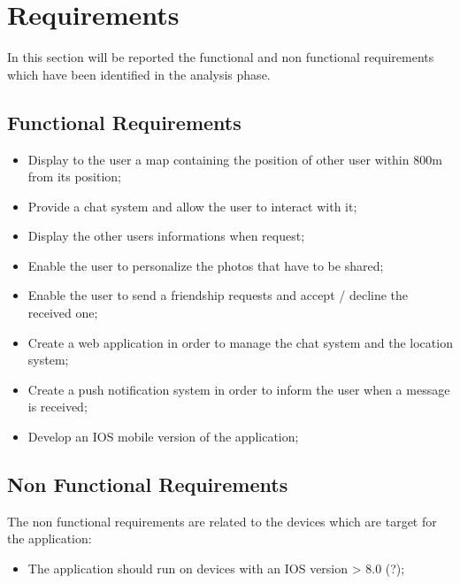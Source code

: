 \section{Requirements}
In this section will be reported the functional and non functional requirements which have been identified in the analysis phase.
\subsection{Functional Requirements}
\begin{itemize}
\item Display to the user a map containing the position of other user within 800m from its position;
\item Provide a chat system and allow the user to interact with it;
\item Display the other users informations when request;
\item Enable the user to personalize the photos that have to be shared;
\item Enable the user to send a friendship requests and accept / decline the received one;
\item Create a web application in order to manage the chat system and the location system;
\item Create a push notification system in order to inform the user when a message is received;
\item Develop an IOS mobile version of the application;
\end{itemize} 


\subsection{Non Functional Requirements}
The non functional requirements are related to the devices which are target for the application:
\begin{itemize}
\item The application should run on devices with an IOS version > 8.0 (?);
\end{itemize}